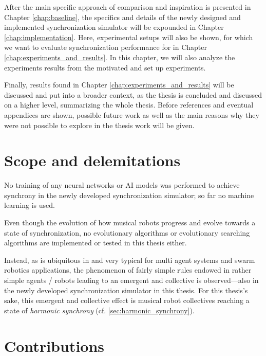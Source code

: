 After the main specific approach of comparison and inspiration is presented in Chapter \ref{chap:baseline}, the specifics and details of the newly designed and implemented synchronization simulator will be expounded in Chapter \ref{chap:implementation}. Here, experimental setups will also be shown, for which we want to evaluate synchronization performance for in Chapter \ref{chap:experiments_and_results}. In this chapter, we will also analyze the experiments results from the motivated and set up experiments.

Finally, results found in Chapter \ref{chap:experiments_and_results} will be discussed and put into a broader context, as the thesis is concluded and discussed on a higher level, summarizing the whole thesis. Before references and eventual appendices are shown, possible future work as well as the main reasons why they were not possible to explore in the thesis work will be given.




\section{Scope and delemitations}

No training of any neural networks or AI models was performed to achieve synchrony in the newly developed synchronization simulator; so far no machine learning is used.

Even though the evolution of how musical robots progress and evolve towards a state of synchronization, no evolutionary algorithms or evolutionary searching algorithms are implemented or tested in this thesis either.

Instead, as is ubiquitous in and very typical for multi agent systems and swarm robotics applications, the phenomenon of fairly simple rules endowed in rather simple agents / robots leading to an emergent and collective is observed—also in the newly developed synchronization simulator in this thesis. For this thesis's sake, this emergent and collective effect is musical robot collectives reaching a state of \textit{harmonic synchrony} (cf. \ref{sec:harmonic_synchrony}).


\section{Contributions}

